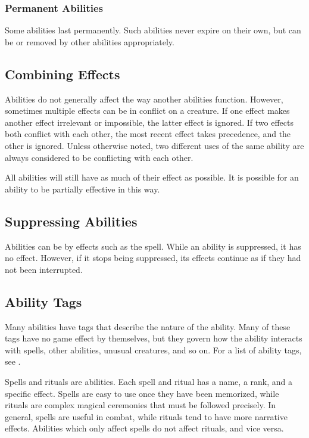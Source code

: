     \subsubsection{Permanent Abilities}
      Some abilities last permanently.
      Such abilities never expire on their own, but can be  or removed by other abilities appropriately.

  \subsection{Combining Effects}
    Abilities do not generally affect the way another abilities function.
    However, sometimes multiple effects can be in conflict on a creature.
    If one effect makes another effect irrelevant or impossible, the latter effect is ignored.
    If two effects both conflict with each other, the most recent effect takes precedence, and the other is ignored.
    Unless otherwise noted, two different uses of the same ability are always considered to be conflicting with each other.

    All abilities will still have as much of their effect as possible.
    It is possible for an ability to be partially effective in this way.

  \subsection{Suppressing Abilities}\label{Suppressing Abilities}
    Abilities can be  by effects such as the  spell.
    While an ability is suppressed, it has no effect.
    However, if it stops being suppressed, its effects continue as if they had not been interrupted.

  \subsection{Ability Tags}
    Many abilities have tags that describe the nature of the ability.
    Many of these tags have no game effect by themselves, but they govern how the ability interacts with spells, other abilities, unusual creatures, and so on.
    For a list of ability tags, see .


  Spells and rituals are \magical abilities.
  Each spell and ritual has a name, a rank, and a specific effect.
  Spells are easy to use once they have been memorized, while rituals are complex magical ceremonies that must be followed precisely.
  In general, spells are useful in combat, while rituals tend to have more narrative effects.
  Abilities which only affect spells do not affect rituals, and vice versa.

